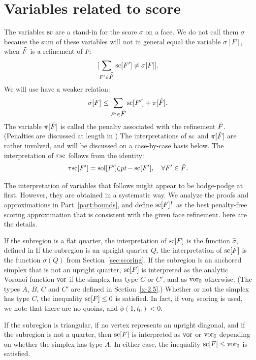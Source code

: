 \section{Variables related to score}
\label{sec:variable}

The variables $\sc$ are a stand-in for the score $\sigma$ on a
face. We do not call them $\sigma$ because the sum of these
variables will not in general equal the variable $\sigma[F]$, when
$\tildeF$ is a refinement of $F$:
    $$[\sum_{F'\in \tildeF }\sc[F'] \ne \sigma[F]].$$
We will use have a weaker relation:
    $$\sigma[F] \le \sum_{F'\in \tildeF }\sc[F'] + \pi[\tildeF].$$
The variable $\pi[\tildeF]$ is called the penalty associated with
the refinement $\tildeF$.  (Penalties are discussed at length in
 ) The interpretations of $\sc$ and
$\pi[\tildeF]$ are rather involved, and will be discussed on a
case-by-case basis below. The interpretation of $\tausc$ follows
from the identity:
    $$\tausc[F'] = \sol[F']\zeta\pt - \sc[F'],\quad\forall
    F'\in \tildeF .$$

The interpretation of variables that follows might appear to be
hodge-podge at first.  However, they are obtained in a systematic
way. We analyze the proofs and approximations in
Part~\ref{part:bounds}, and define $\sc[F]^I$ as the best
penalty-free scoring approximation that is consistent with the
given face refinement. here are the details.

If the subregion is a flat quarter, the interpretation of $\sc[F]$
is the function $\hat\sigma$, defined in 
  If the subregion is an upright
quarter $Q$, the interpretation of $\sc[F]$ is the function
$\sigma(Q)$ from Section~\ref{sec:scoring}. If the subregion is an
anchored simplex that is not an upright quarter, $\sc[F]$ is
interpreted as the analytic Voronoi function $\vor$ if the simplex
has type $C$ or $C'$, and as $\vor_0$ otherwise. (The types $A$,
$B$, $C$ and $C'$ are defined in Section~\ref{x-2.5}.) Whether or
not the simplex has type $C$, the inequality $\sc[F]\le0$ is
satisfied. In fact, if $\vor_0$ scoring is used, we note that
there are no quoins, and $\phi(1,t_0)<0$.

If the subregion is triangular, if no vertex represents an upright
diagonal, and if the subregion is not a quarter, then $\sc[F]$ is
interpreted as  $\vor$ or $\vor_0$ depending on whether the
simplex has type $A$.  In either case, the inequality
$\sc[F]\le\vor_0$ is satisfied.

